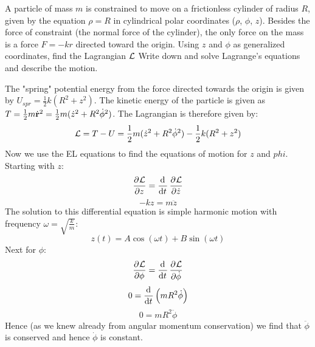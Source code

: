 \begin{p}
A particle of mass $m$ is constrained to move on a frictionless  cylinder of radius $R$, given by the equation $\rho = R$ in cylindrical polar coordinates ($\rho$, $\phi$, $z$). Besides the force of constraint (the normal force of the cylinder), the only force on the mass is a force $F = -kr$ directed toward the origin. Using $z$ and $\phi$ as generalized coordinates, find the Lagrangian $\mathcal{L}$ Write down and solve Lagrange's equations and describe the motion. 
\end{p}
\begin{s}
The "spring" potential energy from the force directed towards the origin is given by $U_{spr} = \frac{1}{2}k(R^2 + z^2)$. The kinetic energy of the particle is given as $T = \frac{1}{2}m\dot{\mathbf{r}}^2 = \frac{1}{2}m(\dot{z}^2 + R^2\dot{\phi}^2)$. The Lagrangian is therefore given by:
\[\mathcal{L} = T - U = \frac{1}{2}m(\dot{z}^2 + R^2\dot{\phi}^2) - \frac{1}{2}k(R^2 + z^2)\]
Now we use the EL equations to find the equations of motion for $z$ and $phi$. Starting with $z$:
\[\dpd{\LL}{z} = \dod{}{t}\dpd{\LL}{\dot{z}}\]
\[- kz = m\ddot{z}\]
The solution to this differential equation is simple harmonic motion with frequency $\omega = \sqrt{\frac{k}{m}}$:
\[z(t) = A\cos(\omega t) + B\sin(\omega t)\]
Next for $\phi$:
\[\dpd{\LL}{\phi} = \dod{}{t}\dpd{\LL}{\dot{\phi}}\]
\[0 = \dod{}{t}\left(mR^2\dot{\phi}\right)\]
\[0 = mR^2\ddot{\phi}\]
Hence (as we knew already from angular momentum conservation) we find that $\ddot{\phi}$ is conserved and hence $\dot{\phi}$ is constant. 
\end{s}